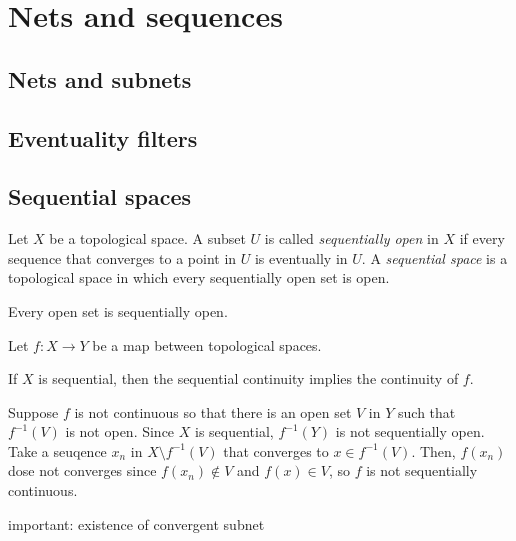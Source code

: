 \documentclass{../note}
\begin{document}
\chapter{Nets and sequences}
\section{Nets and subnets}
\section{Eventuality filters}
\section{Sequential spaces}



\begin{prb}
Let $X$ be a topological space.
A subset $U$ is called \emph{sequentially open} in $X$ if every sequence that converges to a point in $U$ is eventually in $U$.
A \emph{sequential space} is a topological space in which every sequentially open set is open.
\begin{parts}
\item Every open set is sequentially open.
\item
\end{parts}
\end{prb}

\begin{prb}
Let $f:X\to Y$ be a map between topological spaces.
\begin{parts}
\item If $X$ is sequential, then the sequential continuity implies the continuity of $f$.
\end{parts}
\end{prb}
\begin{pf}
Suppose $f$ is not continuous so that there is an open set $V$ in $Y$ such that $f^{-1}(V)$ is not open.
Since $X$ is sequential, $f^{-1}(Y)$ is not sequentially open.
Take a seuqence $x_n$ in $X\setminus f^{-1}(V)$ that converges to $x\in f^{-1}(V)$.
Then, $f(x_n)$ dose not converges since $f(x_n)\notin V$ and $f(x)\in V$, so $f$ is not sequentially continuous.
\end{pf}

\begin{prb}
\end{prb}


important: existence of convergent subnet
\end{document}

